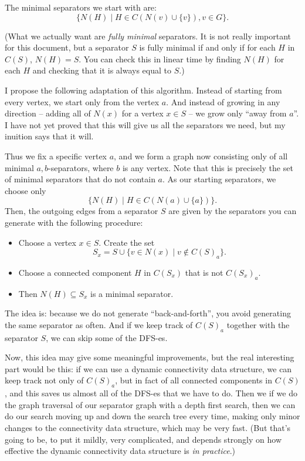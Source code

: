 \documentclass{article}
\begin{document}
The minimal separators we start with are:
\[
    \{N(H) \mid H \in C(N(v) \cup \{v\}), v \in G\}.
\]

(What we actually want are \emph{fully minimal} separators. It is not really important for this
document, but a separator $S$ is fully minimal if and only if for each $H$ in $C(S)$, $N(H) =
S$. You can check this in linear time by finding $N(H)$ for each $H$ and checking that it is
always equal to $S$.)

I propose the following adaptation of this algorithm. Instead of starting from every vertex, we
start only from the vertex $a$. And instead of growing in any direction -- adding all of $N(x)$
for a vertex $x \in S$ -- we grow only ``away from $a$''. I have not yet proved that this will
give us all the separators we need, but my inuition says that it will.

Thus we fix a specific vertex $a$, and we form a graph now consisting only of all minimal $a,
b$-separators, where $b$ is any vertex. Note that this is precisely the set of minimal
separators that do not contain $a$. As our starting separators, we choose only
\[
    \{N(H) \mid H \in C(N(a) \cup \{a\})\}.
\]
Then, the outgoing edges from a separator $S$ are given by the separators you can generate with
the following procedure:
\begin{itemize}
    \item Choose a vertex $x \in S$. Create the set
        \[
            S_x = S \cup \{v \in N(x) \mid v \notin C(S)_a\}.
        \]
    \item Choose a connected component $H$ in $C(S_x)$ that is not $C(S_x)_a$.
    \item Then $N(H) \subseteq S_x$ is a minimal separator.
\end{itemize}
The idea is: because we do not generate ``back-and-forth'', you avoid generating the same
separator as often. And if we keep track of $C(S)_a$ together with the separator $S$, we can
skip some of the DFS-es.

Now, this idea may give some meaningful improvements, but the real interesting part would be
this: if we can use a dynamic connectivity data structure, we can keep track not only of
$C(S)_a$, but in fact of all connected components in $C(S)$, and this saves us almost all of
the DFS-es that we have to do. Then we if we do the graph traversal of our separator graph with
a depth first search, then we can do our search moving up and down the search tree every time,
making only minor changes to the connectivity data structure, which may be very fast. (But
that's going to be, to put it mildly, very complicated, and depends strongly on how effective
the dynamic connectivity data structure is \emph{in practice}.)
\end{document}
